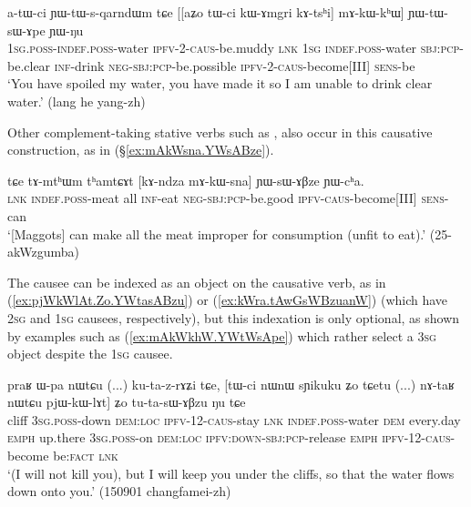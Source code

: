  \begin{exe}
\ex  \label{ex:mAkWkhW.YWtWsApe}
\gll a-tɯ-ci ɲɯ-tɯ-s-qarndɯm tɕe [[aʑo tɯ-ci kɯ-ɤmgri kɤ-tsʰi] mɤ-kɯ-kʰɯ] ɲɯ-tɯ-sɯ-ɤpe ɲɯ-ŋu  \\
\textsc{1sg}.\textsc{poss}-\textsc{indef}.\textsc{poss}-water \textsc{ipfv}-\textsc{2}-\textsc{caus}-be.muddy \textsc{lnk} \textsc{1sg} \textsc{indef}.\textsc{poss}-water \textsc{sbj}:\textsc{pcp}-be.clear \textsc{inf}-drink \textsc{neg}-\textsc{sbj}:\textsc{pcp}-be.possible \textsc{ipfv}-2-\textsc{caus}-become[III] \textsc{sens}-be \\
\glt `You have spoiled my water, you have made it so I am unable to drink clear water.' (lang he yang-zh)
\end{exe}

Other com\-ple\-ment-taking stative verbs such as , also occur in this causative construction, as in (§\ref{ex:mAkWsna.YWsABze}).

 \begin{exe}
\ex  \label{ex:mAkWsna.YWsABze}
\gll tɕe tɤ-mtʰɯm tʰamtɕɤt [kɤ-ndza mɤ-kɯ-sna] ɲɯ-sɯ-ɤβze ɲɯ-cʰa. \\
\textsc{lnk} \textsc{indef}.\textsc{poss}-meat all \textsc{inf}-eat \textsc{neg}-\textsc{sbj}:\textsc{pcp}-be.good \textsc{ipfv}-\textsc{caus}-become[III] \textsc{sens}-can \\
\glt `[Maggots] can make all the meat improper for consumption (unfit to eat).' (25-akWzgumba)
\end{exe}

The causee can be indexed as an object on the causative verb, as in (\ref{ex:pjWkWlAt.Zo.YWtasABzu}) or (\ref{ex:kWra.tAwGsWBzuanW}) (which have \textsc{2sg} and \textsc{1sg} causees, respectively), but this indexation is only optional, as shown by examples such as (\ref{ex:mAkWkhW.YWtWsApe}) which rather select a \textsc{3sg} object despite the \textsc{1sg} causee.

 \begin{exe}
\ex  \label{ex:pjWkWlAt.Zo.YWtasABzu}
\gll praʁ ɯ-pa nɯtɕu (...) ku-ta-z-rɤʑi tɕe, [tɯ-ci nɯnɯ sɲikuku ʑo tɕetu (...) nɤ-taʁ nɯtɕu pjɯ-kɯ-lɤt] ʑo tu-ta-sɯ-ɤβzu ŋu tɕe \\
cliff \textsc{3sg}.\textsc{poss}-down \textsc{dem}:\textsc{loc} { } \textsc{ipfv}-1\fl{}2-\textsc{caus}-stay \textsc{lnk} \textsc{indef}.\textsc{poss}-water \textsc{dem} every.day \textsc{emph} up.there { } \textsc{3sg}.\textsc{poss}-on \textsc{dem}:\textsc{loc} \textsc{ipfv}:\textsc{down}-\textsc{sbj}:\textsc{pcp}-release \textsc{emph} \textsc{ipfv}-1\fl{}2-\textsc{caus}-become be:\textsc{fact} \textsc{lnk} \\
\glt `(I will not kill you), but I will keep you under the cliffs, so that the water flows down onto you.' (150901 changfamei-zh)
\end{exe}


